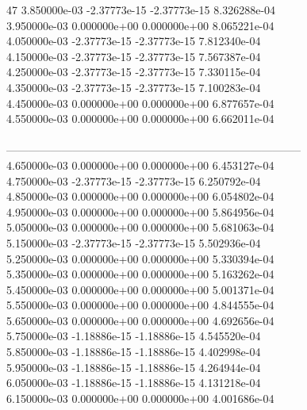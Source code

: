 47	3.850000e-03	-2.37773e-15	-2.37773e-15	8.326288e-04	\\ 	3.950000e-03	0.000000e+00	0.000000e+00	8.065221e-04	\\ 	4.050000e-03	-2.37773e-15	-2.37773e-15	7.812340e-04	\\ 	4.150000e-03	-2.37773e-15	-2.37773e-15	7.567387e-04	\\ 	4.250000e-03	-2.37773e-15	-2.37773e-15	7.330115e-04	\\ 	4.350000e-03	-2.37773e-15	-2.37773e-15	7.100283e-04	\\ 	4.450000e-03	0.000000e+00	0.000000e+00	6.877657e-04	\\ 	4.550000e-03	0.000000e+00	0.000000e+00	6.662011e-04	\\ \hline
\\ \hline
--------------------------------------------------------------------------------\\ 	4.650000e-03	0.000000e+00	0.000000e+00	6.453127e-04	\\ 	4.750000e-03	-2.37773e-15	-2.37773e-15	6.250792e-04	\\ 	4.850000e-03	0.000000e+00	0.000000e+00	6.054802e-04	\\ 	4.950000e-03	0.000000e+00	0.000000e+00	5.864956e-04	\\ 	5.050000e-03	0.000000e+00	0.000000e+00	5.681063e-04	\\ 	5.150000e-03	-2.37773e-15	-2.37773e-15	5.502936e-04	\\ 	5.250000e-03	0.000000e+00	0.000000e+00	5.330394e-04	\\ 	5.350000e-03	0.000000e+00	0.000000e+00	5.163262e-04	\\ 	5.450000e-03	0.000000e+00	0.000000e+00	5.001371e-04	\\ 	5.550000e-03	0.000000e+00	0.000000e+00	4.844555e-04	\\ 	5.650000e-03	0.000000e+00	0.000000e+00	4.692656e-04	\\ 	5.750000e-03	-1.18886e-15	-1.18886e-15	4.545520e-04	\\ 	5.850000e-03	-1.18886e-15	-1.18886e-15	4.402998e-04	\\ 	5.950000e-03	-1.18886e-15	-1.18886e-15	4.264944e-04	\\ 	6.050000e-03	-1.18886e-15	-1.18886e-15	4.131218e-04	\\ 	6.150000e-03	0.000000e+00	0.000000e+00	4.001686e-04	\\ \hline
